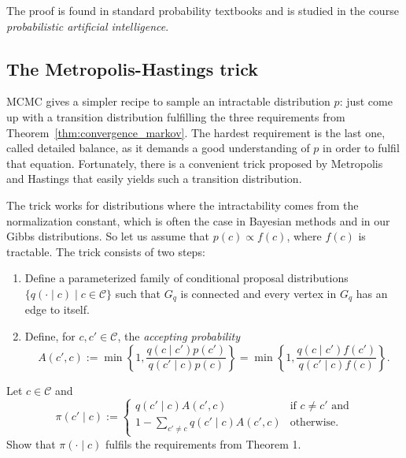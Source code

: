 The proof is found in standard probability textbooks and is studied in
the course \emph{probabilistic artificial intelligence}.

\subsection{The Metropolis-Hastings trick}

MCMC gives a simpler recipe to sample an intractable distribution $p$: just
come up with a transition distribution fulfilling the three requirements
from Theorem~\ref{thm:convergence_markov}. The hardest requirement is the last one, called detailed
balance, as it demands a good understanding of $p$ in order to fulfil that
equation. Fortunately, there is a convenient trick proposed by Metropolis
and Hastings that easily yields such a transition distribution.

The trick works for distributions where the intractability comes from
the normalization constant, which is often the case in Bayesian methods
and in our Gibbs distributions. So let us assume that $p(c) \propto f(c)$, where
$f(c)$ is tractable. The trick consists of two steps:

\begin{enumerate}
\item Define a parameterized family of conditional proposal distributions
$\{q(\cdot \mid c) \mid c \in \mathcal{C}\}$ such that $G_q$ is connected and every vertex in $G_q$
has an edge to itself.
\item Define, for $c, c' \in \mathcal{C}$, the \emph{accepting probability}
%
\begin{equation}
A(c', c) := \min\left\{1, \frac{q(c \mid c')p(c')}{q(c' \mid c)p(c)}\right\} = \min\left\{1, \frac{q(c \mid c')f(c')}{q(c' \mid c)f(c)}\right\}.
\end{equation}
%
\end{enumerate}

\begin{exercise}
Let $c \in \mathcal{C}$ and
%
\begin{equation}
\pi(c' \mid c) := \begin{cases}
q(c' \mid c)A(c', c) & \text{if $c \neq c'$ and}\\
1 - \sum_{c' \neq c}q(c' \mid c)A(c', c) & \text{otherwise}.
\end{cases}
\end{equation}
%
Show that $\pi(\cdot \mid c)$ fulfils the requirements from Theorem 1.
\end{exercise}

